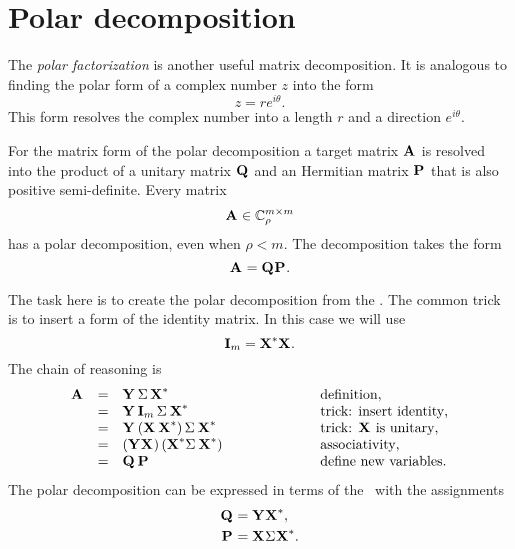 \section{Polar decomposition}
The \textit{polar factorization} is another useful matrix decomposition. It is analogous to finding the polar form of a complex number $z$ into the form
\begin{equation}
  z = r e^{i \theta}.
  \label{eq:zpolar}
\end{equation}
This form resolves the complex number into a length $r$ and a direction $e^{i \theta}$. 

For the matrix form of the polar decomposition a target matrix $\textbf{A}^{\mathrm{}}$ is resolved into the product of a unitary matrix $\textbf{Q}^{\mathrm{}}$ and an Hermitian matrix $\textbf{P}^{\mathrm{}}$ that is also positive semi-definite. Every matrix
$$
\textbf{A}^{\mathrm{}}\in\mathbb{C}^{m \times m}_{\rho}
$$
has a polar decomposition, even when $\rho<m$.
The decomposition takes the form
\begin{equation}
  \textbf{A}^{\mathrm{}} = \textbf{Q}^{\mathrm{}}\textbf{P}^{\mathrm{}}.
\end{equation}

The task here is to create the polar decomposition from the \svdl. The common trick is to insert a form of the identity matrix. In this case we will use
\begin{equation}
  \textbf{I}_{m} = \textbf{X}^{\mathrm{*}}\textbf{X}^{\mathrm{}}.
\end{equation}
The chain of reasoning is 
\begin{equation}
\begin{array}{rcll}
  \textbf{A}^{\mathrm{}}&=&\textbf{Y}^{\mathrm{}}\, \Sigma \, \textbf{X}^{\mathrm{ \mathrm{*} }} \qquad\qquad\qquad &\text{definition},\\
      &=&\textbf{Y}^{\mathrm{}}\,\textbf{I}_{m}\,\Sigma^{\mathrm{}}\,\textbf{X}^{\mathrm{*}} \qquad\qquad\qquad &\text{trick: insert identity},\\
      &=&\textbf{Y}^{\mathrm{}}\left( \textbf{X}^{\mathrm{}}\,\textbf{X}^{\mathrm{*}} \right)\Sigma^{\mathrm{}}\,\textbf{X}^{\mathrm{*}} \qquad\qquad\qquad &\text{trick: }\textbf{X}^{\mathrm{}}\text{ is unitary},\\
      &=&\left( \textbf{Y}^{\mathrm{}}\textbf{X}^{\mathrm{}} \right)\left( \textbf{X}^{\mathrm{*}}\Sigma^{\mathrm{}}\,\textbf{X}^{\mathrm{*}} \right) \qquad\qquad\qquad &\text{associativity},\\
      &=&\textbf{Q}^{\mathrm{}}\,\textbf{P}^{\mathrm{}} \qquad\qquad\qquad &\text{define new variables}.
\end{array}
\end{equation}
The polar decomposition can be expressed in terms of the \svdl \ with the assignments
\begin{equation}
  \begin{split}
    \textbf{Q}^{\mathrm{}} &= \textbf{Y}^{\mathrm{}}\textbf{X}^{\mathrm{*}},\\
    \textbf{P}^{\mathrm{}} &= \textbf{X}^{\mathrm{}}\Sigma^{\mathrm{}}\textbf{X}^{\mathrm{*}}.
  \end{split}
\end{equation}

